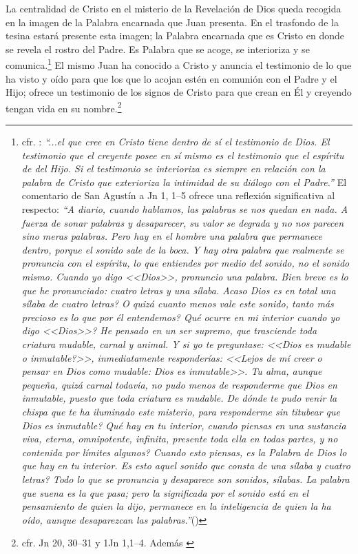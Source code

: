 \documentclass[12pt]{article}
\begin{document}
{La centralidad de Cristo en el misterio de la Revelación de Dios queda recogida en la imagen de la Palabra encarnada que Juan presenta. En el trasfondo de la tesina estará presente esta imagen; la Palabra encarnada que es Cristo en donde se revela el rostro del Padre. Es Palabra que se acoge, se interioriza y se comunica.\footnote{
cfr. \cite[p.~1530]{dicctf}: \emph{``...el que cree en Cristo tiene dentro de sí el testimonio de Dios. El testimonio que el creyente posee en sí mismo es el testimonio que el espíritu de del Hijo. Si el testimonio se interioriza es siempre en relación con la palabra de Cristo que exterioriza la intimidad de su diálogo con el Padre.''} El comentario de San Agustín a Jn 1, 1--5 ofrece una reflexión significativa al respecto:
\emph{``A diario, cuando hablamos, las palabras se nos quedan en nada. A fuerza de sonar palabras y desaparecer, su valor se degrada y no nos parecen sino meras palabras. Pero hay en el hombre una palabra que permanece dentro, porque el sonido sale de la boca. Y hay otra palabra que realmente se pronuncia con el espíritu, lo que entiendes por medio del sonido, no el sonido mismo. Cuando yo digo <<Dios>>, pronuncio una palabra. Bien breve es lo que he pronunciado: cuatro letras y una sílaba. \textquestiondown Acaso Dios es en total una sílaba de cuatro letras? \textquestiondown O quizá cuanto menos vale este sonido, tanto más precioso es lo que por él entendemos? \textquestiondown Qué ocurre en mi interior cuando yo digo <<Dios>>? He pensado en un ser supremo, que trasciende toda criatura mudable, carnal y animal. Y si yo te preguntase: <<\textquestiondown Dios es mudable o inmutable?>>, inmediatamente responderías: <<Lejos de mí creer o pensar en Dios como mudable: Dios es inmutable>>. Tu alma, aunque pequeña, quizá carnal todavía, no pudo menos de responderme que Dios en inmutable, puesto que toda criatura es mudable. \textquestiondown De dónde te pudo venir la chispa que te ha iluminado este misterio, para responderme sin titubear que Dios es inmutable? \textquestiondown Qué hay en tu interior, cuando piensas en una sustancia viva, eterna, omnipotente, infinita, presente toda ella en todas partes, y no contenida por límites algunos? Cuando esto piensas, es la Palabra de Dios lo que hay en tu interior. \textquestiondown Es esto aquel sonido que consta de una sílaba y cuatro letras? Todo lo que se pronuncia y desaparece son sonidos, sílabas. La palabra que suena es la que pasa; pero la significada por el sonido está en el pensamiento de quien la dijo, permanece en la inteligencia de quien la ha oído, aunque desaparezcan las palabras.''}(\cite[n.~8]{aguscomentjn})
}
El mismo Juan ha conocido a Cristo y anuncia el testimonio de lo que ha visto y oído para que los que lo acojan estén en comunión con el Padre y el Hijo; ofrece un testimonio de los signos de Cristo para que crean en Él y creyendo tengan vida en su nombre.\footnote{cfr. Jn 20, 30--31 y 1Jn 1,1--4. Además \cite[1530]{dicctf}} 

}
\end{document}
